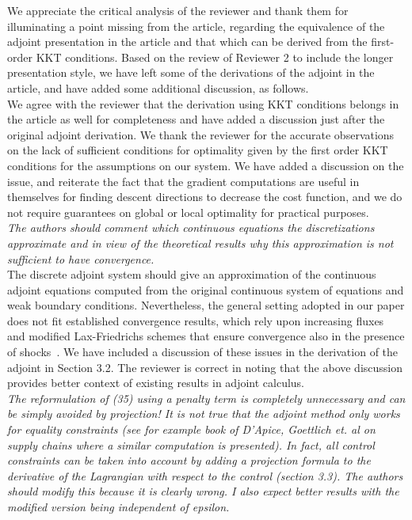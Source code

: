 \documentclass[10pt]{article}
\begin{document}
 We appreciate the critical analysis of the reviewer and thank them for illuminating a point missing from the article, regarding the equivalence of the adjoint presentation in the article and that which can be derived from the first-order KKT conditions. Based on the review of Reviewer 2 to include the longer presentation style, we have left some of the derivations of the adjoint in the article, and have added some additional discussion, as follows.\\

 We agree with the reviewer that the derivation using KKT conditions belongs in the article as well for completeness and have added a discussion just after the original adjoint derivation. We thank the reviewer for the accurate observations on the lack of sufficient conditions for optimality given by the first order KKT conditions for the assumptions on our system. We have added a discussion on the issue, and reiterate the fact that the gradient computations are useful in themselves for finding descent directions to decrease the cost function, and we do not require guarantees on global or local optimality for practical purposes.  \\


\emph{The authors should comment which continuous equations the
discretizations approximate and in view of the theoretical results why
this approximation is not sufficient to have convergence.}\\

The discrete adjoint system should give an approximation of the continuous adjoint equations computed from the original continuous system of equations and weak boundary conditions. Nevertheless, the general setting adopted in our paper does not fit established convergence results, which rely upon increasing fluxes~\cite{Gugat2005} and modified Lax-Friedrichs schemes that ensure convergence also in the presence of shocks~\cite{giles2010convergencepart1,giles2010convergencepart2}. We have included a discussion of these issues in the derivation of the adjoint in Section 3.2. The reviewer is correct in noting that the above discussion provides better context of existing results in adjoint calculus.\\


\emph{The reformulation of (35) using a penalty term is completely  unnecessary
and can be simply avoided by projection!  It is not true that the adjoint
method only works for equality constraints (see for example book of D'Apice, Goettlich et. al on supply chains where a similar computation is presented). In fact, all control constraints can be taken
into account by adding a projection formula to the derivative of the Lagrangian with
respect to the control (section 3.3).
The authors should modify this because it is clearly wrong. I also expect
better results with the modified version being independent of epsilon.}\\
\end{document}
